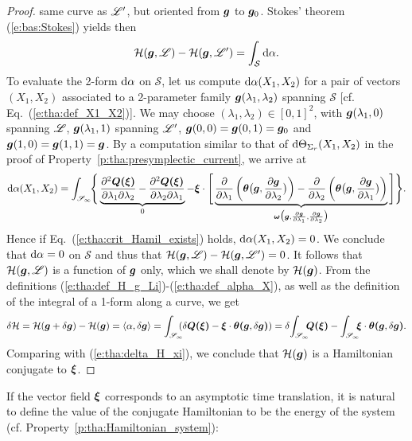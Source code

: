 \begin{proof}
same curve as $\mathscr{L}'$, but oriented from $\bm{g}$ to $\bm{g}_0$.
Stokes' theorem (\ref{e:bas:Stokes}) yields then
\[
    \mathcal{H}(\bm{g},\mathscr{L}) - \mathcal{H}(\bm{g},\mathscr{L}') = \int_{\mathcal{S}} \mathrm{d} \alpha .
\]
To evaluate the 2-form $\mathrm{d} \alpha$ on $\mathcal{S}$, let us compute
$\mathrm{d} \alpha(X_1,X_2)$ for a pair of vectors $(X_1,X_2)$ associated to a
2-parameter family $\bm{g}(\lambda_1,\lambda_2)$ spanning $\mathcal{S}$
[cf. Eq.~(\ref{e:tha:def_X1_X2})]. We may choose $(\lambda_1,\lambda_2)\in[0,1]^2$,
with $\bm{g}(\lambda_1,0)$ spanning $\mathscr{L}$, $\bm{g}(\lambda_1,1)$ spanning $\mathscr{L}'$,
$\bm{g}(0,0) = \bm{g}(0,1) = \bm{g}_0$ and $\bm{g}(1,0) = \bm{g}(1,1) = \bm{g}$.
By a computation similar to that of $\mathrm{d} \Theta_{\Sigma_r} (X_1,X_2)$ in the proof
of Property~\ref{p:tha:presymplectic_current}, we arrive at
\[
    \mathrm{d} \alpha(X_1,X_2) =
    \int_{\mathscr{S}_\infty}\!\!  \Bigg\{
    \underbrace{\frac{\partial^2 \bm{Q}\textbf{(}\bm{\xi}\textbf{)}}{\partial\lambda_1\partial\lambda_2}
    - \frac{\partial^2 \bm{Q}\textbf{(}\bm{\xi}\textbf{)}}{\partial\lambda_2\partial\lambda_1}}_{0}
    - \bm{\xi}\cdot \Bigg[
    \underbrace{
    \frac{\partial }{\partial \lambda_1}
        \left( \bm{\theta} \bm{\big(}\bm{g}, \frac{\partial \bm{g}}{\partial \lambda_2} \bm{\big)} \right)
        - \frac{\partial }{\partial \lambda_2}\left( \bm{\theta}\bm{\big(}\bm{g}, \frac{\partial \bm{g}}{\partial \lambda_1} \bm{\big)} \right)
    }_{\bm{\omega}\bm{\big(}\bm{g},  \frac{\partial \bm{g}}{\partial \lambda_1}, \frac{\partial \bm{g}}{\partial \lambda_2} \bm{\big)}}
        \Bigg] \Bigg\} .
\]
Hence if Eq.~(\ref{e:tha:crit_Hamil_exists}) holds, $\mathrm{d}\alpha(X_1,X_2) = 0$.
We conclude that $\mathrm{d} \alpha = 0$ on $\mathcal{S}$ and thus that
$\mathcal{H}(\bm{g},\mathscr{L}) - \mathcal{H}(\bm{g},\mathscr{L}') = 0$. It follows that
$\mathcal{H}(\bm{g},\mathscr{L})$ is a function of $\bm{g}$ only, which we shall denote
by $\mathcal{H}(\bm{g})$.
From the definitions (\ref{e:tha:def_H_g_Li})-(\ref{e:tha:def_alpha_X}),
as well as the definition of the integral of a 1-form along a curve,
we get
\[
   \delta\mathcal{H} = \mathcal{H}(\w{g}+\delta\w{g}) - \mathcal{H}(\w{g})
   =  \langle \alpha, \delta\w{g} \rangle
     = \int_{\Sp_\infty}\!\!\!\! \left( \delta \w{Q}\lld\w{\xi}\rld
     -  \w{\xi}\cdot\w{\theta}\lld\w{g},\delta\w{g}\rld \right)
    = \delta\! \int_{\Sp_\infty}\!\!\! \w{Q}\lld\w{\xi}\rld
     -  \int_{\Sp_\infty} \!\!\! \w{\xi}\cdot\w{\theta}\lld\w{g},\delta\w{g}\rld .
\]
Comparing with (\ref{e:tha:delta_H_xi}), we conclude that $\mathcal{H}(\bm{g})$
is a Hamiltonian conjugate to $\bm{\xi}$.
\end{proof}

If the vector field $\bm{\xi}$ corresponds to an asymptotic time translation, it
is natural to define the value of the conjugate Hamiltonian to be the
energy of the system (cf. Property~\ref{p:tha:Hamiltonian_system}):

